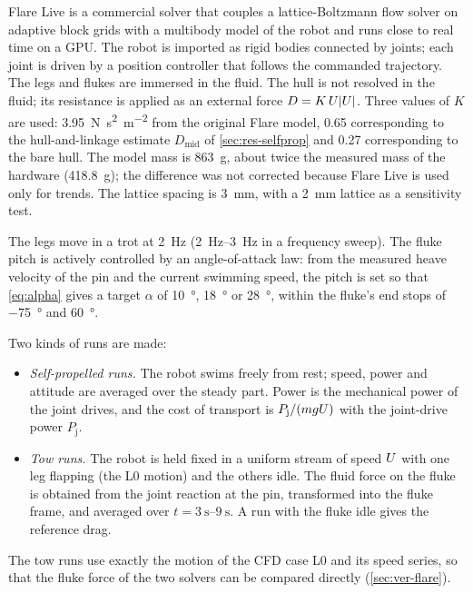Flare Live \cite{FlareLive} is a commercial solver that couples a lattice-Boltzmann flow solver on adaptive block
grids with a multibody model of the robot and runs close to real time on a GPU. The robot is imported as rigid
bodies connected by joints; each joint is driven by a position controller that follows the commanded trajectory.
The legs and flukes are immersed in the fluid. The hull is not resolved in the fluid; its resistance is applied as
an external force $D=K\,U|U|$. Three values of $K$ are used: \SI{3.95}{\newton\second\squared\per\metre\squared}
from the original Flare model, \SI{0.65}{} corresponding to the hull-and-linkage estimate $D_\text{mid}$ of
\cref{sec:res-selfprop} and \SI{0.27}{} corresponding to the bare hull. The model mass is \SI{863}{\gram}, about twice the measured mass of the hardware (\SI{418.8}{\gram}); the difference was not corrected because Flare Live is used only for trends. The
lattice spacing is \SI{3}{\milli\metre}, with a \SI{2}{\milli\metre} lattice as a sensitivity test.

The legs move in a trot at \SI{2}{\hertz} (\SIrange{2}{3}{\hertz} in a frequency sweep). The fluke pitch is actively
controlled by an angle-of-attack law: from the measured heave velocity of the pin and the current swimming speed,
the pitch is set so that \eqref{eq:alpha} gives a target $\alpha$ of \SI{10}{\degree}, \SI{18}{\degree} or
\SI{28}{\degree}, within the fluke's end stops of \SI{-75}{\degree} and \SI{+60}{\degree}.

Two kinds of runs are made:
\begin{itemize}
  \item \emph{Self-propelled runs.} The robot swims freely from rest; speed, power and attitude are averaged over
        the steady part. Power is the mechanical power of the joint drives, and the cost of transport is $P_\text{j}/(mgU)$ with the joint-drive power $P_\text{j}$.
  \item \emph{Tow runs.} The robot is held fixed in a uniform stream of speed $U$ with one leg flapping (the L0
        motion) and the others idle. The fluid force on the fluke is obtained from the joint reaction at the pin,
        transformed into the fluke frame, and averaged over $t=\SIrange{3}{9}{\second}$. A run with the fluke idle
        gives the reference drag.
\end{itemize}
The tow runs use exactly the motion of the CFD case L0 and its speed series, so that the fluke force of the two
solvers can be compared directly (\cref{sec:ver-flare}).
